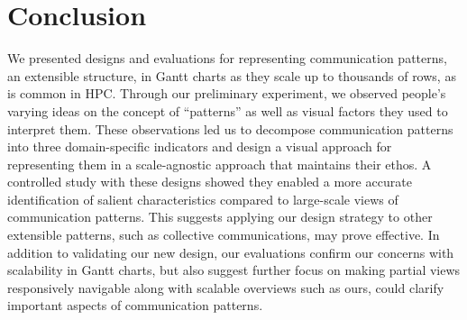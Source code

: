 \section{Conclusion}
\label{sec:conclusion}

We presented designs and evaluations for representing communication patterns, an extensible structure, in Gantt charts as they scale up to thousands of rows, as is common in HPC. Through our preliminary experiment, we observed people's varying ideas on the concept of ``patterns'' as well as visual factors they used to interpret them. These observations led us to decompose communication patterns into three domain-specific indicators and design a visual approach for representing them in a scale-agnostic approach that maintains their ethos. A controlled study with these designs showed they enabled a more accurate identification of salient characteristics compared to large-scale views of communication patterns. This suggests applying our design strategy to other extensible patterns, such as collective communications, may prove effective. In addition to validating our new design, our evaluations confirm our concerns with scalability in Gantt charts, but also suggest further focus on making partial views responsively navigable along with scalable overviews such as ours, could clarify important aspects of communication patterns. 